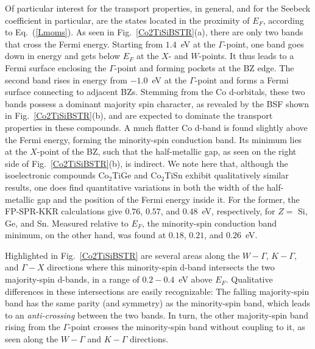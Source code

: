 \documentclass[aps,prb,twocolumn,superscriptaddress,showpacs]{revtex4}
\newcommand{\FG}[1]{Fig.~\ref{#1}}
\newcommand{\EQ}[1]{Eq.~(\ref{#1})}
\begin{document}
Of particular interest for the transport properties, in general, 
and for the Seebeck coefficient in particular, 
are the states located in the proximity of $E_F$, 
according to \EQ{Lmoms}. As seen in \FG{Co2TiSiBSTR}(a), 
there are only two bands that cross the Fermi energy.
Starting from $1.4$~eV at the $\Gamma$-point, one band goes
down in energy and gets below $E_F$ at the $X$- and $W$-points.
It thus leads to a Fermi surface enclosing the
$\Gamma$-point and forming pockets at the BZ edge. 
The second band rises in energy from $-1.0$~eV at
the $\Gamma$-point and forms
a Fermi surface connecting to adjacent BZs.
Stemming from the Co d-orbitals, these two bands possess a
dominant majority spin character, as revealed by
the BSF shown in \FG{Co2TiSiBSTR}(b), and 
are expected to dominate the transport properties in 
these compounds. 
A much flatter Co d-band 
is found slightly above the Fermi energy, forming the
minority-spin conduction band. Its minimum lies at
the $X$-point of the BZ, such that the half-metallic gap,
as seen on the right side of \FG{Co2TiSiBSTR}(b), is
indirect.
We note here that, although 
the isoelectronic compounds Co$_2$TiGe and Co$_2$TiSn
exhibit qualitatively similar results, 
one does find quantitative variations in both
the width of the half-metallic gap and the
position of the Fermi energy inside it.
For the former, the FP-SPR-KKR calculations
give $0.76$, $0.57$, and $0.48$~eV, respectively,
for $Z=$ Si, Ge, and Sn. Measured relative to $E_F$, 
the minority-spin conduction band minimum,
on the other hand, was found at $0.18$, $0.21$, and $0.26$~eV.

Highlighted in \FG{Co2TiSiBSTR} are several areas along the
$W-\Gamma$, $K-\Gamma$, and $\Gamma-X$ directions where
this minority-spin d-band intersects the two 
majority-spin d-bands, in a range of $0.2-0.4$~eV above $E_F$.
Qualitative differences in these intersections are
easily recognizable: The falling majority-spin band
has the same parity (and
symmetry) as the minority-spin band, which leads to an 
{\em anti-crossing} between the two bands. 
In turn, the other majority-spin band rising from
the $\Gamma$-point crosses the minority-spin band without 
coupling to it, as seen along the $W-\Gamma$ and 
$K-\Gamma$ directions.
\end{document}
